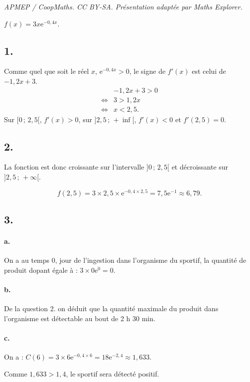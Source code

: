 \documentclass[10pt]{article}
\providecommand{\e}{{\mathrm{e}}}
\begin{document}
\noindent\textit{APMEP / CoopMaths. CC BY-SA. Présentation adaptée par Maths Explorer.}\par\medskip
\(f(x) = 3x\e^{-0{,}4x}\).

\subsection*{1.}

Comme quel que soit le réel \(x\), \(\e^{-0{,}4x} > 0\), le signe de \(f'(x)\) est celui de \(-1{,}2x + 3\).
\begin{align*}
&-1{,}2x + 3 > 0 \\
\iff &3 > 1{,}2x \\
\iff &x < 2{,}5.
\end{align*}
Sur \([0 \,;\, 2{,}5[\), \( f'(x) > 0 \), sur \(]2{,}5 \,;\, +\inf[\), \( f'(x) < 0 \) et \( f'(2{,}5) = 0 \).

\subsection*{2.}

La fonction est donc croissante sur l'intervalle \(]0 \,;\, 2{,}5[\) et décroissante sur \(]2{,}5 \,;\, +\infty[\).

\[
f(2{,}5) = 3 \times 2{,}5 \times \e^{-0{,}4 \times 2{,}5} = 7{,}5 \e^{-1} \approx 6{,}79.
\]

\begin{center}
\end{center}

\subsection*{3.}

\paragraph{a.} On a au temps 0, jour de l'ingestion dans l'organisme du sportif, la quantité de produit dopant égale à : \(3 \times 0\e^0 = 0\).

\paragraph{b.} De la question 2. on déduit que la quantité maximale du produit dans l'organisme est détectable au bout de 2 h 30 min.

\paragraph{c.} On a : \(C(6) = 3 \times 6\e^{-0{,}4 \times 6} = 18 \e^{-2{,}4} \approx 1{,}633\).

Comme \(1{,}633 > 1{,}4\), le sportif sera détecté positif.
\end{document}
